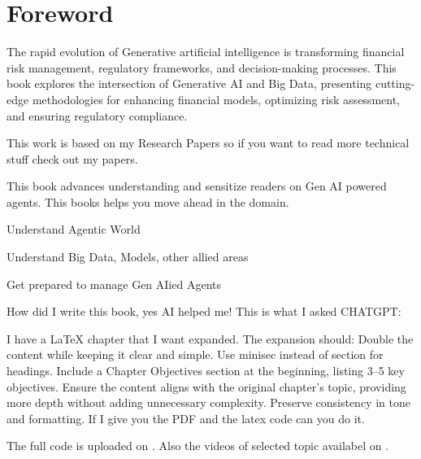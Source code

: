 \documentclass[a4paper,headinclude=on,footinclude=on,12pt,oneside]{scrbook}
\begin{document}
	\listoflistings
	
	\chapter*{Foreword}

	The rapid evolution of Generative artificial intelligence is transforming financial risk management, regulatory frameworks, and decision-making processes. 
	This book explores the intersection of Generative AI and Big Data, presenting cutting-edge methodologies for enhancing financial models, optimizing risk assessment, and ensuring regulatory compliance. 
	
	This work is based on my Research Papers so if you want to read more technical stuff check out my papers. 
	
	
	
	This book advances understanding and sensitize readers on Gen AI powered agents. This books helps you move ahead in the domain.
	
	\begin{arrows}
		\item Understand Agentic World
		\item Understand Big Data, Models, other allied areas
		\item Get prepared to manage Gen AIied Agents 
	\end{arrows}
	
	
	How did I write this book, yes AI helped me!
	This is what I asked CHATGPT:
	
	I have a LaTeX chapter that I want expanded. The expansion should:
	Double the content while keeping it clear and simple.
	Use minisec instead of section for headings.
	Include a Chapter Objectives section at the beginning, listing 3–5 key objectives.
	Ensure the content aligns with the original chapter's topic, providing more depth without adding unnecessary complexity.
	Preserve consistency in tone and formatting.
	If I give you the PDF and the latex code can you do it.
	
	
	The full code is uploaded on \cite{JoshiGit2025}.
	Also the videos of selected topic availabel on \cite{JoshiYouTube2025}.
	
\end{document}
